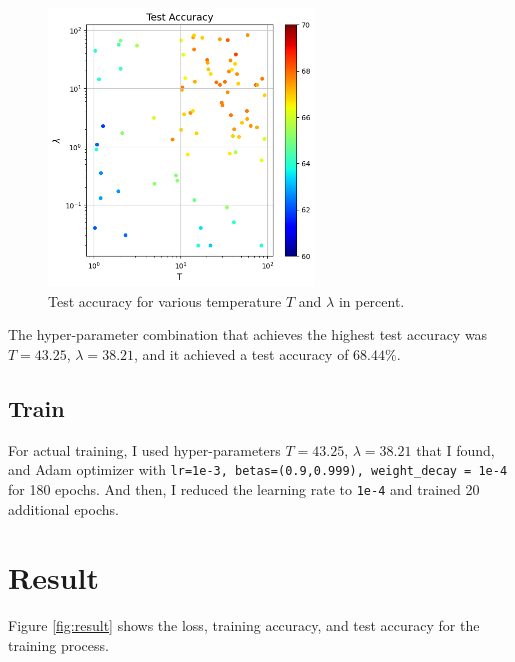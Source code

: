 \documentclass{article}
\begin{document}
\begin{figure}[h!]
    \centering
    \includegraphics[width=200pt]{hyp.png}
    \caption{Test accuracy for various temperature $T$ and $\lambda$ in percent.}
    \label{fig:hyp-param-plot}
\end{figure}
The hyper-parameter combination that achieves the highest test accuracy was $T=43.25$, $\lambda=38.21$, and it achieved a test accuracy of $68.44\%$.
\subsection{Train}
For actual training, I used hyper-parameters $T=43.25$, $\lambda=38.21$ that I found, and Adam optimizer with \texttt{lr=1e-3, betas=(0.9,0.999), weight\_decay = 1e-4} for 180 epochs. And then, I reduced the learning rate to \texttt{1e-4} and trained 20 additional epochs.

\section{Result}

Figure \ref{fig:result} shows the loss, training accuracy, and test accuracy for the training process.
\end{document}
